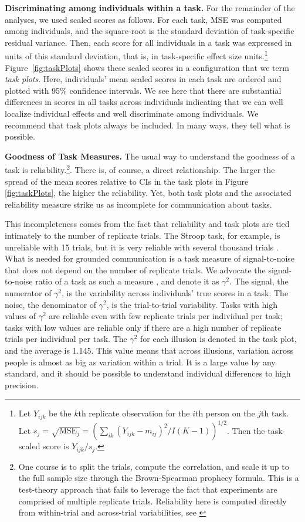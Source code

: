 \documentclass[man, 12pt]{apa7} %
\begin{document}
{\bf Discriminating among individuals within a task.}  For the remainder of the analyses, we used scaled scores as follows.  For each task, MSE was computed among individuals, and the square-root is the standard deviation of task-specific residual variance.  Then, each score for all individuals in a task was expressed in units of this standard deviation, that is, in task-specific effect size units.\footnote{Let $Y_{ijk}$ be the $k$th replicate observation for the $i$th person on the $j$th task.  Let $s_j=\sqrt{\mbox{MSE}_j}=\left(\sum_{ik}(Y_{ijk}-m_{ij})^2/I(K-1)\right)^{1/2}$. Then the task-scaled score is $Y_{ijk}/s_j$.}  Figure~\ref{fig:taskPlots} shows these scaled scores in a configuration that we term {\em task plots}.  Here, individuals' mean scaled scores in each task are ordered and plotted with 95\% confidence intervals.  We see here that there are substantial differences in scores in all tasks across individuals indicating that we can well localize individual effects and well discriminate among individuals.  We recommend that task plots always be included.  In many ways, they tell what is possible.

{\bf Goodness of Task Measures.}  The usual way to understand the goodness of a task is reliability.\footnote{One course is to split the trials, compute the correlation, and scale it up to the full sample size through the Brown-Spearman prophecy formula.  This is a test-theory approach that fails to leverage the fact that experiments are comprised of multiple replicate trials.  Reliability here is computed directly from within-trial and across-trial variabilities, see \textcite{Rouder.Mehrvarz.2024}}.    There is, of course, a direct relationship.  The larger the spread of the mean scores relative to CIs in the task plots in Figure \ref{fig:taskPlots}, the higher the reliability.  Yet, both task plots and the associated reliability measure strike us as incomplete for communication about tasks.  

This incompleteness comes from the fact that reliability and task plots are tied intimately to the number of replicate trials.  The Stroop task, for example, is unreliable with 15 trials, but it is very reliable with several thousand trials \parencite[]{Lee.etal.2023}.  What is needed for grounded communication is a task measure of signal-to-noise that does not depend on the number of replicate trials.  We advocate the signal-to-noise ratio of a task as such a measure \parencite[]{Rouder.Mehrvarz.2024}, and denote it as $\gamma^2$.  The signal, the numerator of $\gamma^2$, is the variability across individuals' true scores in a task.  The noise, the denominator of $\gamma^2$, is the trial-to-trial variability.  Tasks with high values of $\gamma^2$ are reliable even with few replicate trials per individual per task; tasks with low values are reliable only if there are a high number of replicate trials per individual per task.  The $\gamma^2$ for each illusion is denoted in the task plot, and the average is 1.145.  This value means that across illusions, variation across people is almost as big as variation within a trial.  It is a large value by any standard, and it should be possible to understand individual differences to high precision.
\end{document}
